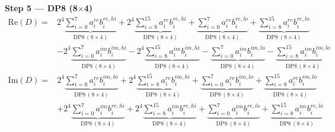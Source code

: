 \documentclass[fleqn]{article}
\newcommand{\DPop}[3]{\mathrm{DP#1}\,(#2\!\times\!#3)}
\begin{document}
\textbf{Step 5 --- DP8 (8$\times$4)}
\begin{align*}
\mathrm{Re}(D) = {}
  & 2^{4} \underbrace{\sum_{i=0}^{7} a_i^{re} b_i^{re,hi}}_{\DPop{8}{8}{4}}
  + 2^{4} \underbrace{\sum_{i=8}^{15} a_i^{re} b_i^{re,hi}}_{\DPop{8}{8}{4}}
  + \underbrace{\sum_{i=0}^{7} a_i^{re} b_i^{re,lo}}_{\DPop{8}{8}{4}}
  + \underbrace{\sum_{i=8}^{15} a_i^{re} b_i^{re,lo}}_{\DPop{8}{8}{4}} \\[1em]
  & - 2^{4} \underbrace{\sum_{i=0}^{7} a_i^{im} b_i^{im,hi}}_{\DPop{8}{8}{4}}
  - 2^{4} \underbrace{\sum_{i=8}^{15} a_i^{im} b_i^{im,hi}}_{\DPop{8}{8}{4}}
  - \underbrace{\sum_{i=0}^{7} a_i^{im} b_i^{im,lo}}_{\DPop{8}{8}{4}}
  - \underbrace{\sum_{i=8}^{15} a_i^{im} b_i^{im,lo}}_{\DPop{8}{8}{4}}
\end{align*}
\begin{align*}
\mathrm{Im}(D) = {}
  & 2^{4} \underbrace{\sum_{i=0}^{7} a_i^{re} b_i^{im,hi}}_{\DPop{8}{8}{4}}
  + 2^{4} \underbrace{\sum_{i=8}^{15} a_i^{re} b_i^{im,hi}}_{\DPop{8}{8}{4}}
  + \underbrace{\sum_{i=0}^{7} a_i^{re} b_i^{im,lo}}_{\DPop{8}{8}{4}}
  + \underbrace{\sum_{i=8}^{15} a_i^{re} b_i^{im,lo}}_{\DPop{8}{8}{4}} \\[1em]
  & + 2^{4} \underbrace{\sum_{i=0}^{7} a_i^{im} b_i^{re,hi}}_{\DPop{8}{8}{4}}
  + 2^{4} \underbrace{\sum_{i=8}^{15} a_i^{im} b_i^{re,hi}}_{\DPop{8}{8}{4}}
  + \underbrace{\sum_{i=0}^{7} a_i^{im} b_i^{re,lo}}_{\DPop{8}{8}{4}}
  + \underbrace{\sum_{i=8}^{15} a_i^{im} b_i^{re,lo}}_{\DPop{8}{8}{4}}
\end{align*}
\end{document}
